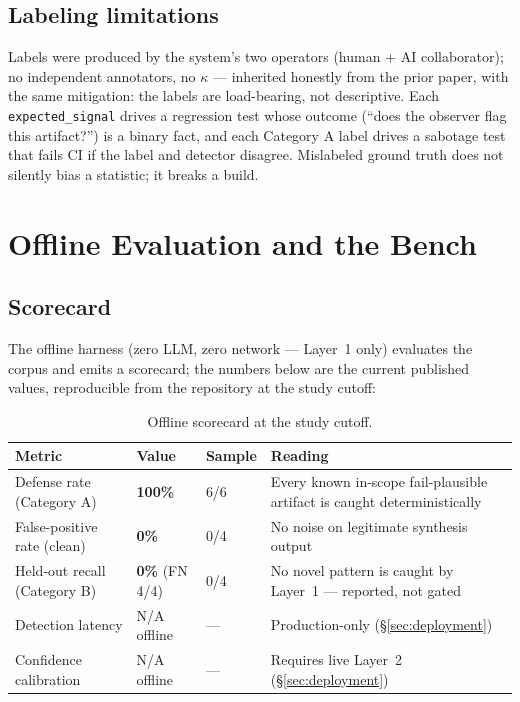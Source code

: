 \documentclass[11pt]{article}
\begin{document}
\subsection{Labeling limitations}
\label{sec:labeling}

Labels were produced by the system's two operators (human + AI
collaborator); no independent annotators, no $\kappa$ --- inherited
honestly from the prior paper, with the same mitigation: the labels are
load-bearing, not descriptive. Each \texttt{expected\_signal} drives a
regression test whose outcome (``does the observer flag this
artifact?'') is a binary fact, and each Category A label drives a
sabotage test that fails CI if the label and detector disagree.
Mislabeled ground truth does not silently bias a statistic; it breaks a
build.

\section{Offline Evaluation and the Bench}
\label{sec:bench}

\subsection{Scorecard}

The offline harness (zero LLM, zero network --- Layer~1 only) evaluates
the corpus and emits a scorecard; the numbers below are the current
published values, reproducible from the repository at the study cutoff:

\begin{table}[h]
\centering\small
\begin{tabular}{@{}lllp{6.4cm}@{}}
\toprule
\textbf{Metric} & \textbf{Value} & \textbf{Sample} & \textbf{Reading} \\
\midrule
Defense rate (Category A) & \textbf{100\%} & 6/6 & Every known in-scope
fail-plausible artifact is caught deterministically \\
False-positive rate (clean) & \textbf{0\%} & 0/4 & No noise on
legitimate synthesis output \\
Held-out recall (Category B) & \textbf{0\%} (FN 4/4) & 0/4 & No novel
pattern is caught by Layer~1 --- reported, not gated \\
Detection latency & N/A offline & --- & Production-only
(\S\ref{sec:deployment}) \\
Confidence calibration & N/A offline & --- & Requires live Layer~2
(\S\ref{sec:deployment}) \\
\bottomrule
\end{tabular}
\caption{Offline scorecard at the study cutoff.}
\label{tab:scorecard}
\end{table}
\end{document}
